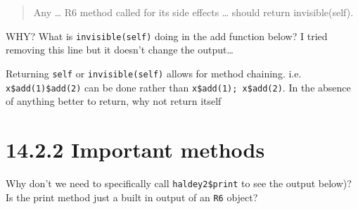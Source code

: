 \documentclass[]{book}
\newenvironment{Shaded}{\begin{snugshade}}{\end{snugshade}}
\newcommand{\ControlFlowTok}[1]{\textcolor[rgb]{0.13,0.29,0.53}{\textbf{#1}}}
\newcommand{\DataTypeTok}[1]{\textcolor[rgb]{0.13,0.29,0.53}{#1}}
\newcommand{\DecValTok}[1]{\textcolor[rgb]{0.00,0.00,0.81}{#1}}
\newcommand{\KeywordTok}[1]{\textcolor[rgb]{0.13,0.29,0.53}{\textbf{#1}}}
\newcommand{\NormalTok}[1]{#1}
\newcommand{\OperatorTok}[1]{\textcolor[rgb]{0.81,0.36,0.00}{\textbf{#1}}}
\newcommand{\StringTok}[1]{\textcolor[rgb]{0.31,0.60,0.02}{#1}}
\begin{document}
\begin{quote}
Any \ldots{} R6 method called for its side effects \ldots{} should return invisible(self).
\end{quote}

WHY? What is \texttt{invisible(self)} doing in the add function below? I tried removing this line but it doesn't change the output\ldots{}

\begin{Shaded}
\end{Shaded}

Returning \texttt{self} or \texttt{invisible(self)} allows for method chaining. i.e. \texttt{x\$add(1)\$add(2)} can be done rather than \texttt{x\$add(1);\ x\$add(2)}. In the absence of anything better to return, why not return itself

\hypertarget{important-methods}{%
\section*{14.2.2 Important methods}\label{important-methods}}

Why don't we need to specifically call \texttt{haldey2\$print} to see the output below)? Is the print method just a built in output of an \texttt{R6} object?
\end{document}
